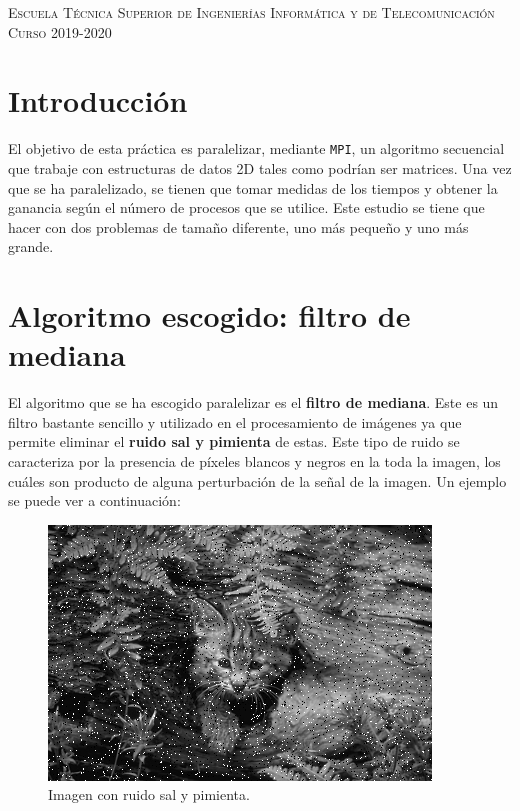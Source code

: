 \documentclass[11pt,a4paper]{article}
\begin{document}
\begin{titlepage}
\begin{minipage}{\textwidth}
\vspace{0.7cm}
\textsc{Escuela Técnica Superior de Ingenierías Informática y de Telecomunicación}\\
\vspace{1cm}
\textsc{Curso 2019-2020}
\end{minipage}
\end{titlepage}

\tableofcontents
\thispagestyle{empty}				%

\newpage

\setlength{\parskip}{1em}

\newpage

\section{Introducción}

El objetivo de esta práctica es paralelizar, mediante \texttt{MPI}, un algoritmo secuencial que
trabaje con estructuras de datos 2D tales como podrían ser matrices. Una vez que se ha
paralelizado, se tienen que tomar medidas de los tiempos y obtener la ganancia según el número
de procesos que se utilice. Este estudio se tiene que hacer con dos problemas de tamaño
diferente, uno más pequeño y uno más grande.

\section{Algoritmo escogido: filtro de mediana}

El algoritmo que se ha escogido paralelizar es el \textbf{filtro de mediana}. Este es un
filtro bastante sencillo y utilizado en el procesamiento de imágenes ya que permite eliminar
el \textbf{ruido sal y pimienta} de estas. Este tipo de ruido se caracteriza por la presencia
de píxeles blancos y negros en la toda la imagen, los cuáles son producto de alguna perturbación
de la señal de la imagen. Un ejemplo se puede ver a continuación:

\begin{figure}[H]
    \centering
    \includegraphics[scale=0.6]{img/cat.png}
    \caption{Imagen con ruido sal y pimienta.}
    \label{fig:cat}
\end{figure}
\end{document}
